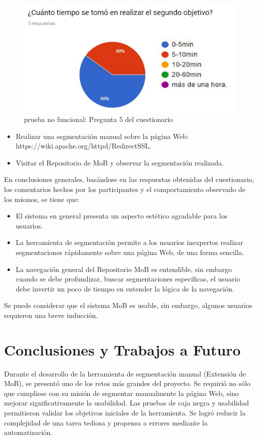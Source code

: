 \documentclass[10pt]{revecom}
\begin{document}
\begin{figure}[!h]
\centering
\includegraphics[scale=0.4]{verif.png}
\centering\caption{prueba no funcional: Pregunta 5 del cuestionario}
\label{fig:nofunc}
\end{figure}

\begin{itemize}
\item Realizar una segmentación manual sobre la página Web: https://wiki.apache.org/httpd/RedirectSSL.
\item Visitar el Repositorio de MoB y observar la segmentación realizada.
\end{itemize}

En conclusiones generales, basándose en las respuestas obtenidas del cuestionario, los comentarios hechos por los participantes y el comportamiento observado de los mismos, se tiene que:
\begin{itemize}
\item El sistema en general presenta un aspecto estético agradable para los usuarios. 
\item La herramienta de segmentación permite a los usuarios inexpertos realizar segmentaciones rápidamente sobre una página Web, de una forma sencilla.
\item La navegación general del Repositorio MoB es entendible, sin embargo cuando se debe profundizar, buscar segmentaciones específicas, el usuario debe invertir un poco de tiempo en entender la lógica de la navegación. 
\end{itemize}
Se puede considerar que el sistema MoB es usable, sin embargo, algunos usuarios requieren una breve inducción. 

\section{Conclusiones y Trabajos a Futuro}
\label{conclusiones}
Durante el desarrollo de la herramienta de segmentación manual (Extensión de MoB), se presentó uno de los retos más grandes del proyecto. Se requirió no sólo que cumpliese con su misión de segmentar manualmente la página Web, sino mejorar significativamente la usabilidad.
Las pruebas de caja negra y usabilidad permitieron validar los objetivos iniciales de la herramienta. Se logró reducir la complejidad de una tarea tediosa y propensa a errores mediante la automatización.
\end{document}

